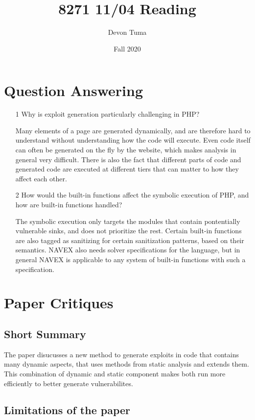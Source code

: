 \documentclass[11pt]{article}
\title{8271 11/04 Reading}
\author{Devon Tuma}
\date{Fall 2020}
\begin{document}
\maketitle

\section*{Question Answering}

\begin{itemize}
\item [1] Why is exploit generation particularly challenging in PHP?

  Many elements of a page are generated dynamically, and are therefore hard to understand without understanding how the code will execute.
  Even code itself can often be generated on the fly by the website, which makes analysis in general very difficult.
  There is also the fact that different parts of code and generated code are executed at different tiers that can matter to how they affect each other.
  
\item [2] How would the built-in functions affect the symbolic execution of PHP, and how are built-in functions handled?

  The symbolic execution only targets the modules that contain pontentially vulnerable sinks, and does not prioritize the rest.
  Certain built-in functions are also tagged as sanitizing for certain sanitization patterns, based on their semantics.
  NAVEX also needs solver specifications for the language, but in general NAVEX is applicable to any system of built-in functions with such a specification.
\end{itemize}

\section*{Paper Critiques}

\subsection*{Short Summary}

The paper disucusses a new method to generate exploits in code that contains many dynamic aspects, that uses methods from static analysis and extends them.
This combination of dynamic and static component makes both run more efficiently to better generate vulnerabilites.

\subsection*{Limitations of the paper}
\end{document}
